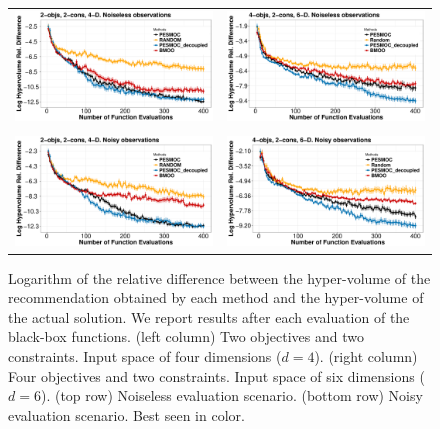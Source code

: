 \begin{figure}[htb]
\begin{tabular}{cc}
        \vspace{-.2cm}
        \includegraphics[width=0.475\linewidth]{Figures/synthetic/4d_noiseless_NEW.pdf} &
        \includegraphics[width=0.475\linewidth]{Figures/synthetic/6d_noiseless_NEW.pdf} \\\\
        \includegraphics[width=0.475\linewidth]{Figures/synthetic/4d_noisy_NEW.pdf} &
        \includegraphics[width=0.475\linewidth]{Figures/synthetic/6d_noisy_NEW.pdf}
        \vspace{-.1cm}
\end{tabular}
\caption{{\small Logarithm of the relative difference between the hyper-volume of
the recommendation obtained by each method and the hyper-volume of the actual solution.
We report results after each evaluation of the black-box functions. (left column) Two objectives and two constraints.
Input space of four dimensions ($d=4$). (right column)
Four objectives and two constraints.  Input space of six dimensions ($d=6$). (top row)
Noiseless evaluation scenario. (bottom row) Noisy evaluation scenario. Best seen in color.}}
        \label{fig:results_synthetic_pesmoc}
        \vspace{-.25cm}
\end{figure}

